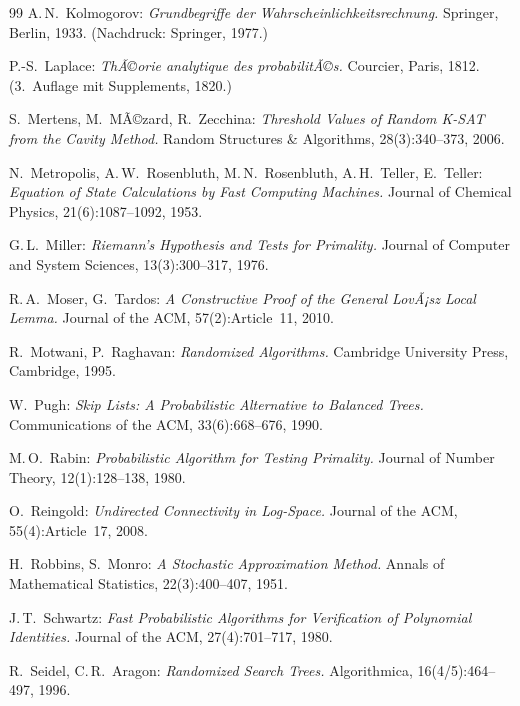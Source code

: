 ﻿\documentclass[12pt,a4paper]{article}
\theoremstyle{definition}
\theoremstyle{plain}
\theoremstyle{remark}
\begin{document}
\begin{thebibliography}{99}
A.\,N.\ Kolmogorov:
\textit{Grundbegriffe der Wahrscheinlichkeitsrechnung.}
Springer, Berlin, 1933.
(Nachdruck: Springer, 1977.)

P.-S.\ Laplace:
\textit{ThÃ©orie analytique des probabilitÃ©s.}
Courcier, Paris, 1812.
(3.~Auflage mit Supplements, 1820.)

S.\ Mertens, M.\ MÃ©zard, R.\ Zecchina:
\textit{Threshold Values of Random K-SAT from the Cavity Method.}
Random Structures \& Algorithms, 28(3):340--373, 2006.

N.\ Metropolis, A.\,W.\ Rosenbluth, M.\,N.\ Rosenbluth, A.\,H.\ Teller, E.\ Teller:
\textit{Equation of State Calculations by Fast Computing Machines.}
Journal of Chemical Physics, 21(6):1087--1092, 1953.

G.\,L.\ Miller:
\textit{Riemann's Hypothesis and Tests for Primality.}
Journal of Computer and System Sciences, 13(3):300--317, 1976.

R.\,A.\ Moser, G.\ Tardos:
\textit{A Constructive Proof of the General LovÃ¡sz Local Lemma.}
Journal of the ACM, 57(2):Article~11, 2010.

R.\ Motwani, P.\ Raghavan:
\textit{Randomized Algorithms.}
Cambridge University Press, Cambridge, 1995.

W.\ Pugh:
\textit{Skip Lists: A Probabilistic Alternative to Balanced Trees.}
Communications of the ACM, 33(6):668--676, 1990.

M.\,O.\ Rabin:
\textit{Probabilistic Algorithm for Testing Primality.}
Journal of Number Theory, 12(1):128--138, 1980.

O.\ Reingold:
\textit{Undirected Connectivity in Log-Space.}
Journal of the ACM, 55(4):Article~17, 2008.

H.\ Robbins, S.\ Monro:
\textit{A Stochastic Approximation Method.}
Annals of Mathematical Statistics, 22(3):400--407, 1951.

J.\,T.\ Schwartz:
\textit{Fast Probabilistic Algorithms for Verification of Polynomial Identities.}
Journal of the ACM, 27(4):701--717, 1980.

R.\ Seidel, C.\,R.\ Aragon:
\textit{Randomized Search Trees.}
Algorithmica, 16(4/5):464--497, 1996.


\end{thebibliography}
\end{document}
